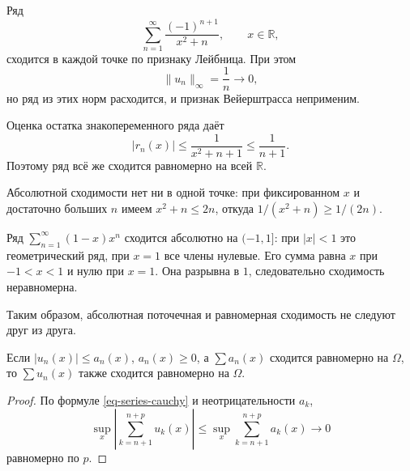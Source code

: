 \begin{example}\label{exm-alternating-functional}

Ряд \[
\sum_{n=1}^\infty\frac{(-1)^{n+1}}{x^2+n},\qquad x\in\mathbb R,
\] сходится в каждой точке по признаку Лейбница. При этом \[
\lVert u_n\rVert_\infty=\frac1n\longrightarrow0,
\] но ряд из этих норм расходится, и признак Вейерштрасса неприменим.

Оценка остатка знакопеременного ряда даёт \[
|r_n(x)|\le\frac1{x^2+n+1}\le\frac1{n+1}.
\] Поэтому ряд всё же сходится равномерно на всей \(\mathbb R\).

Абсолютной сходимости нет ни в одной точке: при фиксированном \(x\) и достаточно больших \(n\) имеем \(x^2+n\le2n\), откуда \(1/(x^2+n)\ge1/(2n)\).

\end{example}

\begin{example}\label{exm-absolute-not-uniform}

Ряд \(\sum_{n=1}^\infty(1-x)x^n\) сходится абсолютно на \((-1,1]\): при \(|x|<1\) это геометрический ряд, при \(x=1\) все члены нулевые. Его сумма равна \(x\) при \(-1<x<1\) и нулю при \(x=1\). Она разрывна в \(1\), следовательно сходимость неравномерна.

\end{example}

Таким образом, абсолютная поточечная и равномерная сходимость не следуют друг из друга.

\begin{theorem}\label{thm-functional-majorant}

Если \(|u_n(x)|\le a_n(x)\), \(a_n(x)\ge0\), а \(\sum a_n(x)\) сходится равномерно на \(\Omega\), то \(\sum u_n(x)\) также сходится равномерно на \(\Omega\).

\end{theorem}

\begin{proof}

По формуле \eqref{eq-series-cauchy} и неотрицательности \(a_k\), \[
\sup_x\left|\sum_{k=n+1}^{n+p}u_k(x)\right|
\le\sup_x\sum_{k=n+1}^{n+p}a_k(x)\longrightarrow0
\] равномерно по \(p\).

\end{proof}
